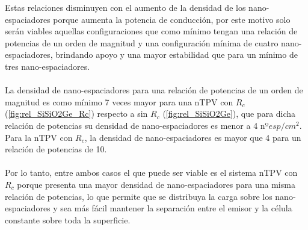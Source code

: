 Estas relaciones disminuyen con el aumento de la densidad de los nano-espaciadores porque aumenta la potencia de conducción, por este motivo solo serán viables aquellas configuraciones que como mínimo tengan una relación de potencias de un orden de magnitud y una configuración mínima de cuatro nano-espaciadores, brindando apoyo y una mayor estabilidad que para un mínimo de tres nano-espaciadores.\\\\
La densidad de nano-espaciadores para una relación de potencias de un orden de magnitud es como mínimo 7 veces mayor para una nTPV con $R_c$ (\ref{fig:rel_SiSiO2Ge_Rc}) respecto a sin $R_c$ (\ref{fig:rel_SiSiO2Ge}), que para dicha relación de potencias su densidad de nano-espaciadores es menor a 4 nº$esp/cm^2$. Para la nTPV con $R_c$, la densidad de nano-espaciadores es mayor que 4 para un relación de potencias de 10.\\\\
Por lo tanto, entre ambos casos el que puede ser viable es el sistema nTPV con $R_c$ porque presenta una mayor densidad de nano-espaciadores para una misma relación de potencias, lo que permite que se distribuya la carga sobre los nano-espaciadores y sea más fácil mantener la separación entre el emisor y la célula constante sobre toda la superficie.
